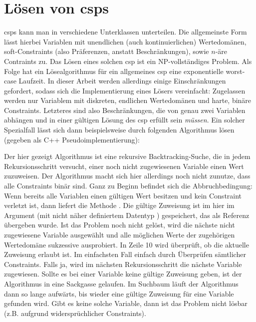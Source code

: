 \section{Lösen von \acp{csp}}
\label{sec:Solving}
\acp{csp} kann man in verschiedene Unterklassen unterteilen. Die allgemeinste Form lässt hierbei Variablen mit unendlichen (auch kontinuierlichen) Wertedomänen, soft-Constraints
(also Präferenzen, anstatt Beschränkungen), sowie $n$-äre Contraints zu. Das Lösen eines solchen \ac*{csp} ist ein NP-vollständiges Problem. Als Folge hat ein Lösealgorithmus für
ein allgemeines \ac*{csp} eine exponentielle worst-case Laufzeit. In dieser Arbeit werden allerdings einige Einschränkungen gefordert, sodass sich die Implementierung eines Lösers
vereinfacht: Zugelassen werden nur Variablem mit diskreten, endlichen Wertedomänen und harte, binäre Constraints. Letzteres sind also Beschränkungen, die von genau zwei Variablen
abhängen und in einer gültigen Lösung des \ac*{csp} erfüllt sein \textit{müssen}. Ein solcher Spezialfall lässt sich dann beispielsweise durch folgenden Algorithmus lösen (gegeben
als C++ Pseudoimplementierung):

Der hier gezeigt Algorithmus ist eine rekursive Backtracking-Suche, die in jedem Rekursionsschritt versucht, einer noch nicht zugewiesenen Variable einen Wert zuzuweisen. Der
Algorithmus macht sich hier allerdings noch nicht zunutze, dass alle Constraints binär sind. Ganz zu Beginn befindet sich die Abbruchbedingung: Wenn bereits alle Variablen einen
gültigen Wert besitzen und kein Constraint verletzt ist, dann liefert die Methode  . Die gültige Zuweisung ist im hier im Argument 
(mit nicht näher definiertem Datentyp ) gespeichert, das als Referenz übergeben wurde. Ist das Problem noch nicht gelöst, wird die nächste nicht zugewiesene Variable
ausgewählt und alle möglichen Werte der zugehörigen Wertedomäne sukzessive ausprobiert. In Zeile 10 wird überprüft, ob die aktuelle Zuweisung erlaubt ist. Im einfachsten Fall
einfach durch Überprüfen sämtlicher Constraints. Falls ja, wird im nächsten Rekursionsschritt die nächste Variable zugewiesen. Sollte es bei einer Variable keine gültige Zuweisung
geben, ist der Algorithmus in eine Sackgasse gelaufen. Im Suchbaum läuft der Algorithmus dann so lange aufwärts, bis wieder eine gültige Zuweisung für eine Variable gefunden wird.
Gibt es keine solche Variable, dann ist das Problem nicht lösbar (z.B. aufgrund  widersprüchlicher Constraints). 

